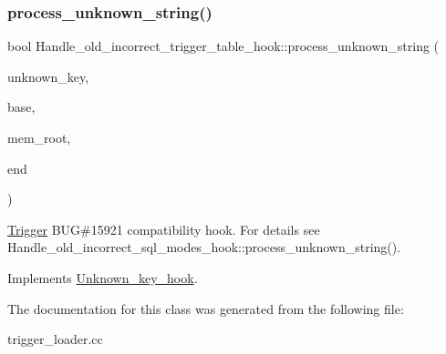 \subsubsection{\texorpdfstring{process\+\_\+unknown\+\_\+string()}{process\_unknown\_string()}}
{\footnotesize\ttfamily bool Handle\+\_\+old\+\_\+incorrect\+\_\+trigger\+\_\+table\+\_\+hook\+::process\+\_\+unknown\+\_\+string (\begin{DoxyParamCaption}\item[{const char $\ast$\&}]{unknown\+\_\+key,  }\item[{uchar $\ast$}]{base,  }\item[{M\+E\+M\+\_\+\+R\+O\+OT $\ast$}]{mem\+\_\+root,  }\item[{const char $\ast$}]{end }\end{DoxyParamCaption})\hspace{0.3cm}{\ttfamily [virtual]}}

\mbox{\hyperlink{classTrigger}{Trigger}} B\+UG\#15921 compatibility hook. For details see Handle\+\_\+old\+\_\+incorrect\+\_\+sql\+\_\+modes\+\_\+hook\+::process\+\_\+unknown\+\_\+string(). 

Implements \mbox{\hyperlink{classUnknown__key__hook}{Unknown\+\_\+key\+\_\+hook}}.



The documentation for this class was generated from the following file\+:\begin{DoxyCompactItemize}
\item 
trigger\+\_\+loader.\+cc\end{DoxyCompactItemize}
